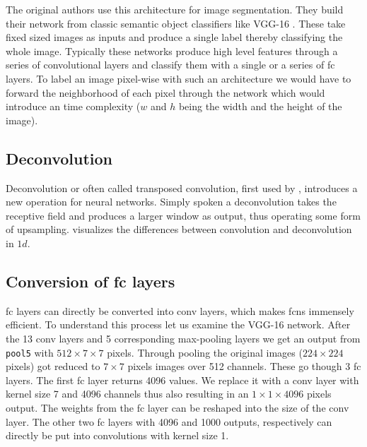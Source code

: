 The original authors use this architecture for image segmentation. They build their network from classic semantic object classifiers like VGG-16 \citep{simonyan_very_2014}. These take fixed sized images as inputs and produce a single label thereby classifying the whole image. Typically these networks produce high level features through a series of convolutional layers and classify them with a single or a series of \gls{fc} layers. To label an image pixel-wise with such an architecture we would have to forward the neighborhood of each pixel through the network which would introduce an  time complexity ($w$ and $h$ being the width and the height of the image).

\subsection{Deconvolution} %
\label{sub:conepts:fcn:deconv}

Deconvolution or often called transposed convolution, first used by \citet{zeiler_deconvolutional_2010}, introduces a new operation for neural networks. Simply spoken a deconvolution takes the receptive field and produces a larger window as output, thus operating some form of upsampling.  visualizes the differences between convolution and deconvolution in $1d$.

\subsection{Conversion of \gls{fc} layers}
\label{sub:concepts:fcn:fc_conversion}
\gls{fc} layers can directly be converted into \gls{conv} layers, which makes \glspl{fcn} immensely efficient. To understand this process let us examine the VGG-16 network. After the 13 \gls{conv} layers and 5  corresponding max-pooling layers we get an output from \texttt{pool5} with $512\times7\times7$ pixels. Through pooling the original images ($224\times224$ pixels) got reduced to $7\times7$ pixels images over 512 channels. These go though 3 \gls{fc} layers. The first \gls{fc} layer returns 4096 values. We replace it with a \gls{conv} layer with kernel size 7 and 4096 channels thus also resulting in an $1\times1\times4096$ pixels output. The weights from the \gls{fc} layer can be reshaped into the size of the \gls{conv} layer. The other two \gls{fc} layers with 4096 and 1000 outputs, respectively can directly be put into convolutions with kernel size 1.

